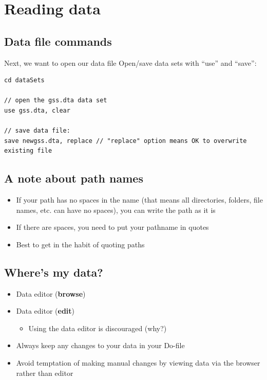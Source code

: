 \documentclass[]{book}
\providecommand{\tightlist}{%
  \setlength{\itemsep}{0pt}\setlength{\parskip}{0pt}}
\begin{document}
\hypertarget{reading-data-2}{%
\section{Reading data}\label{reading-data-2}}

\hypertarget{data-file-commands}{%
\subsection{Data file commands}\label{data-file-commands}}

Next, we want to open our data file
Open/save data sets with ``use'' and ``save'':

\begin{verbatim}
cd dataSets

// open the gss.dta data set
use gss.dta, clear

// save data file:
save newgss.dta, replace // "replace" option means OK to overwrite existing file
\end{verbatim}

\hypertarget{a-note-about-path-names}{%
\subsection{A note about path names}\label{a-note-about-path-names}}

\begin{itemize}
\tightlist
\item
  If your path has no spaces in the name (that means all directories, folders, file names, etc. can have no spaces), you can write the path as it is
\item
  If there are spaces, you need to put your pathname in quotes
\item
  Best to get in the habit of quoting paths
\end{itemize}

\hypertarget{wheres-my-data}{%
\subsection{Where's my data?}\label{wheres-my-data}}

\begin{itemize}
\tightlist
\item
  Data editor (\textbf{browse})
\item
  Data editor (\textbf{edit})

  \begin{itemize}
  \tightlist
  \item
    Using the data editor is discouraged (why?)
  \end{itemize}
\item
  Always keep any changes to your data in your Do-file
\item
  Avoid temptation of making manual changes by viewing data via the browser rather than editor
\end{itemize}
\end{document}
